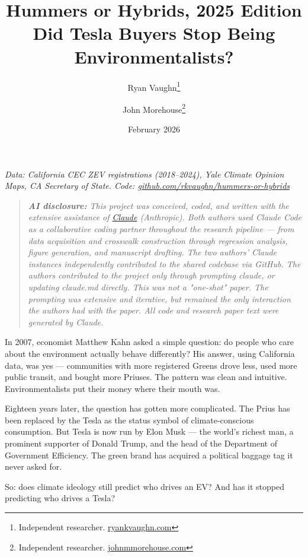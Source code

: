 \documentclass[12pt]{article}
\title{\textbf{Hummers or Hybrids, 2025 Edition}\\[0.5em]
\large Did Tesla Buyers Stop Being Environmentalists?}
\author{Ryan Vaughn\thanks{Independent researcher. \href{https://ryankvaughn.com}{ryankvaughn.com}} \and
John Morehouse\thanks{Independent researcher. \href{https://www.johnmmorehouse.com/}{johnmmorehouse.com}}}
\date{February 2026}
\begin{document}
\maketitle

\begin{center}
\small\textit{Data: California CEC ZEV registrations (2018--2024), Yale Climate Opinion Maps, CA Secretary of State.
Code: \href{https://github.com/rkvaughn/hummers-or-hybrids}{github.com/rkvaughn/hummers-or-hybrids}}
\end{center}

\bigskip

\begin{quote}
\textit{\textbf{AI disclosure:} This project was conceived, coded, and written with the extensive assistance of \href{https://claude.ai}{Claude} (Anthropic). Both authors used Claude Code as a collaborative coding partner throughout the research pipeline --- from data acquisition and crosswalk construction through regression analysis, figure generation, and manuscript drafting. The two authors' Claude instances independently contributed to the shared codebase via GitHub. The authors contributed to the project only through prompting claude, or updating claude.md directly. This was not a "one-shot" paper. The prompting was extensive and iterative, but remained the only interaction the authors had with the paper. All code and research paper text were generated by Claude.}
\end{quote}

\bigskip

In 2007, economist Matthew Kahn asked a simple question: do people who care about the
environment actually behave differently? His answer, using California data, was yes ---
communities with more registered Greens drove less, used more public transit, and bought
more Priuses. The pattern was clean and intuitive. Environmentalists put their money where
their mouth was.

Eighteen years later, the question has gotten more complicated. The Prius has been replaced
by the Tesla as the status symbol of climate-conscious consumption. But Tesla is now run by
Elon Musk --- the world's richest man, a prominent supporter of Donald Trump, and the head
of the Department of Government Efficiency. The green brand has acquired a political
baggage tag it never asked for.

So: does climate ideology still predict who drives an EV? And has it stopped predicting
who drives a Tesla?
\end{document}
